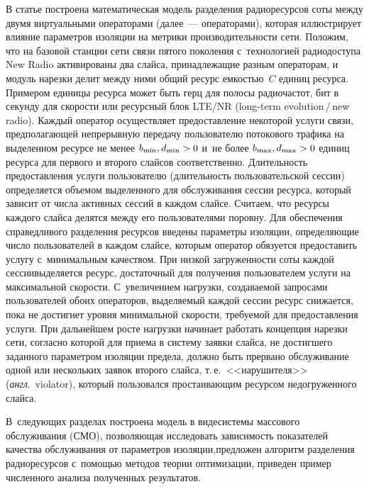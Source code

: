 \begin{multicols}{2}
  В статье построена математическая модель разделения радиоресурсов 
соты между двумя виртуальными операторами (далее~--- операторами), 
которая иллюстрирует влияние параметров изоляции на мет\-рики 
производительности сети. Положим, что на базовой станции сети связи 
пятого поколения с~технологией радиодоступа New Radio активированы два 
слайса, принадлежащие разным операторам, и модуль нарезки делит между 
ними общий ресурс ем\-костью~$C$  единиц ресурса. Примером единицы 
ресурса может быть герц для полосы радиочастот, бит в секунду для 
ско\-рости или ресурсный блок LTE/NR (long-term evolution\,/\,new radio). 
Каждый оператор осуществляет  
предостав\-ле\-ние некоторой услуги связи, пред\-по\-ла\-га\-ющей 
непрерывную передачу пользователю потокового трафика на выделенном 
ресурсе не менее $b_{\min}, d_{\min}\hm >0$ и~не более $b_{\max}, 
d_{\max}\hm>0$ единиц ресурса для первого и второго слайсов 
соответственно. Длительность предостав\-ле\-ния услуги пользователю 
(длительность пользовательской сессии) определяется объемом 
выделенного для обслуживания сессии ресурса, который зависит от числа 
активных сессий в каж\-дом слайсе. Считаем, что ресурсы каждого слайса 
делятся между его пользователями поровну. Для обеспечения 
справедливого разделения ресурсов введены параметры изоляции, 
определяющие чис\-ло пользователей в каждом слайсе, которым оператор 
обязуется предоставить услугу с~минимальным качеством. При низ\-кой 
за\-гру\-жен\-ности соты каждой сессии\linebreak выделяется ресурс, достаточный 
для получения пользователем услуги на максимальной ско\-рости. 
С~увеличением нагрузки, создаваемой запросами пользователей обоих 
операторов, вы\-де\-ля\-емый каж\-дой сессии ресурс снижается, пока не 
достигнет уровня минимальной ско\-рости, тре\-бу\-емой для 
предоставления услуги. При дальнейшем росте нагрузки начинает работать 
концепция нарезки сети, согласно которой для приема в сис\-те\-му заявки 
слайса, не достигшего заданного па\-ра\-мет\-ром изоляции предела, долж\-но 
быть прервано обслуживание одной или нескольких заявок второго 
слайса, т.\,е.\ <<нарушителя>> (\textit{англ}.\ violator), который пользовался 
простаивающим ресурсом недогруженного слайса. 

В~сле\-ду\-ющих разделах 
построена модель в виде\linebreak сис\-те\-мы массового обслуживания (СМО), 
позво\-ля\-ющая исследовать за\-ви\-си\-мость показателей качества 
обслуживания от параметров изоляции,\linebreak предложен алгоритм разделения 
радиоресурсов с~по\-мощью методов теории оптимизации, приведен 
пример  
чис\-лен\-но\-го анализа полученных результатов.
  

\end{multicols}
